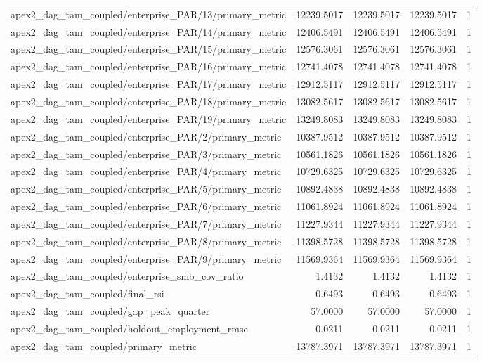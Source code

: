 \begin{table}[h]
\begin{tabular}{lrrrr}
apex2_dag_tam_coupled/enterprise_PAR/13/primary_metric & 12239.5017 & 12239.5017 & 12239.5017 & 1 \\
apex2_dag_tam_coupled/enterprise_PAR/14/primary_metric & 12406.5491 & 12406.5491 & 12406.5491 & 1 \\
apex2_dag_tam_coupled/enterprise_PAR/15/primary_metric & 12576.3061 & 12576.3061 & 12576.3061 & 1 \\
apex2_dag_tam_coupled/enterprise_PAR/16/primary_metric & 12741.4078 & 12741.4078 & 12741.4078 & 1 \\
apex2_dag_tam_coupled/enterprise_PAR/17/primary_metric & 12912.5117 & 12912.5117 & 12912.5117 & 1 \\
apex2_dag_tam_coupled/enterprise_PAR/18/primary_metric & 13082.5617 & 13082.5617 & 13082.5617 & 1 \\
apex2_dag_tam_coupled/enterprise_PAR/19/primary_metric & 13249.8083 & 13249.8083 & 13249.8083 & 1 \\
apex2_dag_tam_coupled/enterprise_PAR/2/primary_metric & 10387.9512 & 10387.9512 & 10387.9512 & 1 \\
apex2_dag_tam_coupled/enterprise_PAR/3/primary_metric & 10561.1826 & 10561.1826 & 10561.1826 & 1 \\
apex2_dag_tam_coupled/enterprise_PAR/4/primary_metric & 10729.6325 & 10729.6325 & 10729.6325 & 1 \\
apex2_dag_tam_coupled/enterprise_PAR/5/primary_metric & 10892.4838 & 10892.4838 & 10892.4838 & 1 \\
apex2_dag_tam_coupled/enterprise_PAR/6/primary_metric & 11061.8924 & 11061.8924 & 11061.8924 & 1 \\
apex2_dag_tam_coupled/enterprise_PAR/7/primary_metric & 11227.9344 & 11227.9344 & 11227.9344 & 1 \\
apex2_dag_tam_coupled/enterprise_PAR/8/primary_metric & 11398.5728 & 11398.5728 & 11398.5728 & 1 \\
apex2_dag_tam_coupled/enterprise_PAR/9/primary_metric & 11569.9364 & 11569.9364 & 11569.9364 & 1 \\
apex2_dag_tam_coupled/enterprise_smb_cov_ratio & 1.4132 & 1.4132 & 1.4132 & 1 \\
apex2_dag_tam_coupled/final_rsi & 0.6493 & 0.6493 & 0.6493 & 1 \\
apex2_dag_tam_coupled/gap_peak_quarter & 57.0000 & 57.0000 & 57.0000 & 1 \\
apex2_dag_tam_coupled/holdout_employment_rmse & 0.0211 & 0.0211 & 0.0211 & 1 \\
apex2_dag_tam_coupled/primary_metric & 13787.3971 & 13787.3971 & 13787.3971 & 1 \\

\end{tabular}
\end{table}
